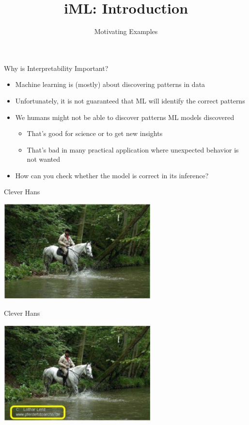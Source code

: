 \documentclass[aspectratio=169]{../latex_main/tntbeamer}  %
\title[Introduction]{iML: Introduction}
\subtitle{Motivating Examples}
\begin{document}
	
	\maketitle

\begin{frame}[c]{Why is Interpretability Important?}
	
	\begin{itemize}
	    \item Machine learning is (mostly) about discovering patterns in data
	    \item Unfortunately, it is not guaranteed that ML will identify the correct patterns
	    \pause
	    \medskip
	    \item We humans might not be able to discover patterns ML models discovered
	    \begin{itemize}
	        \item That's good for science or to get new insights
	        \item That's bad in many practical application where unexpected behavior is not wanted
	    \end{itemize}
	    \medskip
	    \pause
	    \item \alert{How can you check whether the model is correct in its inference?}
	\end{itemize}
	
\end{frame}

\begin{frame}[c]{Clever Hans }
	
	\centering
	\includegraphics[width=0.6\textwidth]{01_introduction/figure/horse_without_label.PNG}
	
\end{frame}

\begin{frame}[c]{Clever Hans }
	
	\centering
	\includegraphics[width=0.6\textwidth]{01_introduction/figure/horse_with_label.PNG}
	
\end{frame}
\end{document}
